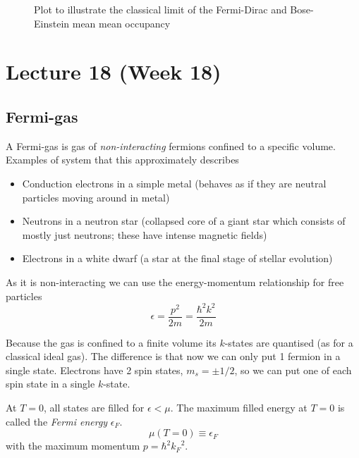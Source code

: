 \documentclass[12pt,chapterprefix=false,dvipsnames]{scrbook}
\theoremstyle{dotless}
\theoremstyle{definition}
\begin{document}
\begin{figure}[htpb]
	\centering
	
	\caption{Plot to illustrate the classical limit of the Fermi-Dirac and
		Bose-Einstein mean mean occupancy}%
	\label{fig:classical_limit}
\end{figure}

\chapter{Lecture 18 (Week 18)}%
\label{cha:lecture_18}

\section{Fermi-gas}%
\label{sec:fermi_gas}

A Fermi-gas is gas of \textit{non-interacting} fermions confined
to a specific volume. Examples of system that this approximately
describes
\begin{itemize}
	\item Conduction electrons in a simple metal (behaves as if they are
	      neutral particles moving around in metal)
	\item Neutrons in a neutron star (collapsed core of a giant star which
	      consists of mostly just neutrons; these have intense magnetic
	      fields)
	\item Electrons in a white dwarf (a star at the final stage of stellar
	      evolution)
\end{itemize}

As it is non-interacting we can use the energy-momentum
relationship for free particles
\begin{equation}
	\epsilon = \frac{p^2}{2m} = \frac{\hbar^2 k^2}{2m}
\end{equation}

Because the gas is confined to a finite volume its
$k$-states are quantised (as for a classical
ideal gas). The difference is that now we can only put 1 fermion
in a single state. Electrons have 2 spin states,
$m_s = \pm 1/2$, so we can put one of each spin state in
a single $k$-state.

At $T = 0$, all states are filled for
$\epsilon < \mu$. The maximum filled energy at
$T = 0$ is called the \textit{Fermi energy}
$\epsilon_F$.
\begin{equation}
	\mu\left(T = 0\right)\equiv\epsilon_F
\end{equation}
with the maximum momentum $p=\hbar^2 {k_F}^{2}$.
\end{document}
